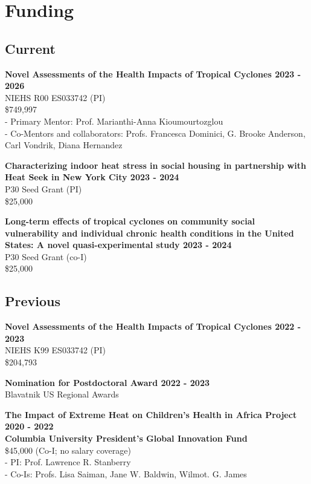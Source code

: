 \section*{Funding}

\subsection*{Current}

\noindent \textbf{Novel Assessments of the Health Impacts of Tropical Cyclones \hfill 2023 - 2026}\\ 
NIEHS R00 ES033742 (PI)\\ 
\$749,997 \\
- Primary Mentor: Prof. Marianthi-Anna Kioumourtozglou\\
- Co-Mentors and collaborators: Profs. Francesca Dominici, G. Brooke Anderson, Carl Vondrik, Diana Hernandez \bigskip

\noindent \textbf{Characterizing indoor heat stress in social housing in partnership with Heat Seek in New York City \hfill 2023 - 2024}\\
P30 Seed Grant (PI)\\
\$25,000 \bigskip

\noindent \textbf{Long-term effects of tropical cyclones on community social vulnerability and individual chronic health conditions in the United States: A novel quasi-experimental study \hfill 2023 - 2024 } \\
P30 Seed Grant (co-I)\\
\$25,000 \bigskip

\subsection*{Previous}


\noindent \textbf{Novel Assessments of the Health Impacts of Tropical Cyclones \hfill 2022 - 2023}\\ 
NIEHS K99 ES033742 (PI)\\ 
\$204,793 \bigskip

\noindent \textbf{Nomination for Postdoctoral Award  \hfill 2022 - 2023} \\
Blavatnik US Regional Awards \bigskip

\noindent \textbf{The Impact of Extreme Heat on Children’s Health in Africa Project \hfill 2020 - 2022\\ 
Columbia University President’s Global Innovation Fund} \\
\$45,000 (Co-I; no salary coverage)\\
- PI: Prof. Lawrence R. Stanberry \\
- Co-Is: Profs. Lisa Saiman, Jane W. Baldwin, Wilmot. G. James \bigskip

